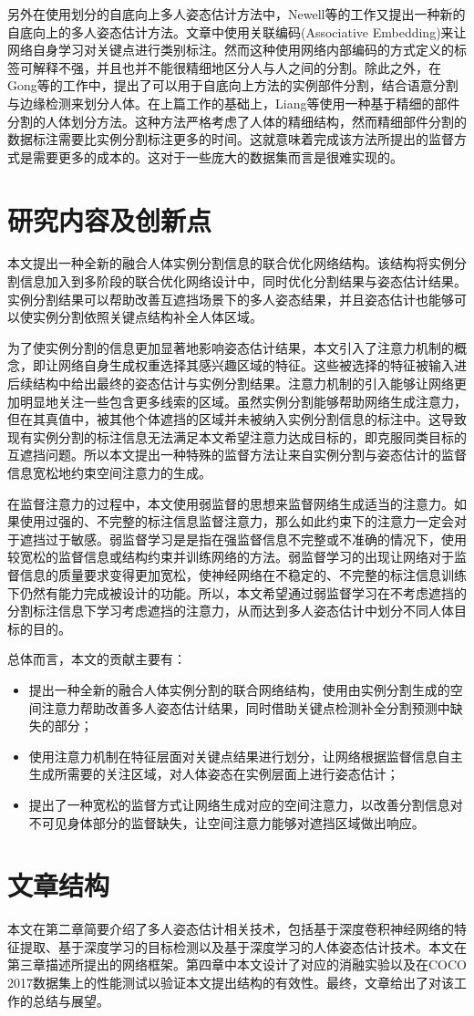 另外在使用划分的自底向上多人姿态估计方法中，Newell等的工作\cite{Newell2017Associative}又提出一种新的自底向上的多人姿态估计方法。文章中使用关联编码(Associative Embedding)来让网络自身学习对关键点进行类别标注。然而这种使用网络内部编码的方式定义的标签可解释不强，并且也并不能很精细地区分人与人之间的分割。除此之外，在Gong等的工作中\cite{gong2018instance}，提出了可以用于自底向上方法的实例部件分割，结合语意分割与边缘检测来划分人体。在上篇工作的基础上，Liang等使用一种基于精细的部件分割的人体划分方法\cite{liang2019look}。这种方法严格考虑了人体的精细结构，然而精细部件分割的数据标注需要比实例分割标注更多的时间。这就意味着完成该方法所提出的监督方式是需要更多的成本的。这对于一些庞大的数据集而言是很难实现的。

\section{研究内容及创新点}
\label{sec:contribution}
本文提出一种全新的融合人体实例分割信息的联合优化网络结构。该结构将实例分割信息加入到多阶段的联合优化网络设计中，同时优化分割结果与姿态估计结果。实例分割结果可以帮助改善互遮挡场景下的多人姿态结果，并且姿态估计也能够可以使实例分割依照关键点结构补全人体区域。

为了使实例分割的信息更加显著地影响姿态估计结果，本文引入了注意力机制的概念，即让网络自身生成权重选择其感兴趣区域的特征。这些被选择的特征被输入进后续结构中给出最终的姿态估计与实例分割结果。注意力机制的引入能够让网络更加明显地关注一些包含更多线索的区域。虽然实例分割能够帮助网络生成注意力，但在其真值中，被其他个体遮挡的区域并未被纳入实例分割信息的标注中。这导致现有实例分割的标注信息无法满足本文希望注意力达成目标的，即克服同类目标的互遮挡问题。所以本文提出一种特殊的监督方法让来自实例分割与姿态估计的监督信息宽松地约束空间注意力的生成。

在监督注意力的过程中，本文使用弱监督的思想来监督网络生成适当的注意力。如果使用过强的、不完整的标注信息监督注意力，那么如此约束下的注意力一定会对于遮挡过于敏感。弱监督学习是是指在强监督信息不完整或不准确的情况下，使用较宽松的监督信息或结构约束并训练网络的方法\cite{10.1093/nsr/nwx106}。弱监督学习的出现让网络对于监督信息的质量要求变得更加宽松，使神经网络在不稳定的、不完整的标注信息训练下仍然有能力完成被设计的功能。所以，本文希望通过弱监督学习在不考虑遮挡的分割标注信息下学习考虑遮挡的注意力，从而达到多人姿态估计中划分不同人体目标的目的。

总体而言，本文的贡献主要有：
\begin{itemize}
	\item 提出一种全新的融合人体实例分割的联合网络结构，使用由实例分割生成的空间注意力帮助改善多人姿态估计结果，同时借助关键点检测补全分割预测中缺失的部分；
	\item 使用注意力机制在特征层面对关键点结果进行划分，让网络根据监督信息自主生成所需要的关注区域，对人体姿态在实例层面上进行姿态估计；
	\item 提出了一种宽松的监督方式让网络生成对应的空间注意力，以改善分割信息对不可见身体部分的监督缺失，让空间注意力能够对遮挡区域做出响应。
\end{itemize}

\section{文章结构}
\label{sec:introconclusion}
本文在第二章简要介绍了多人姿态估计相关技术，包括基于深度卷积神经网络的特征提取、基于深度学习的目标检测以及基于深度学习的人体姿态估计技术。本文在第三章描述所提出的网络框架。第四章中本文设计了对应的消融实验以及在COCO 2017数据集上的性能测试以验证本文提出结构的有效性。最终，文章给出了对该工作的总结与展望。